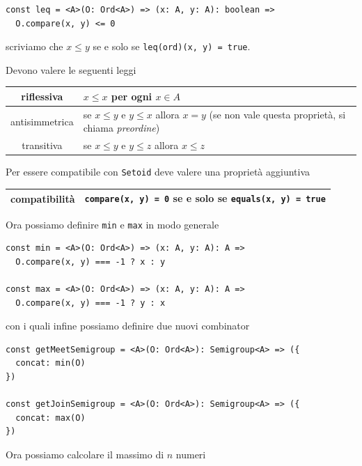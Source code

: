 \documentclass[12pt]{article}
\begin{document}
\begin{verbatim}
const leq = <A>(O: Ord<A>) => (x: A, y: A): boolean =>
  O.compare(x, y) <= 0
\end{verbatim}

scriviamo che $x \leq y$ se e solo se \texttt{leq(ord)(x, y) = true}.

Devono valere le seguenti leggi

\begin{center}
\bgroup
\def\arraystretch{1.5}
\begin{tabular}{ |c|p{10cm}| }
\hline
riflessiva & $x \leq x$ per ogni $x \in A$ \\
\hline
antisimmetrica & se $x \leq y$ e $y \leq x$ allora $x = y$ (se non vale questa proprietà, si chiama \emph{preordine}) \\
\hline
transitiva & se $x \leq y$ e $y \leq z$ allora $x \leq z$ \\
\hline
\end{tabular}
\egroup
\end{center}

Per essere compatibile con \texttt{Setoid} deve valere una proprietà aggiuntiva

\begin{center}
\bgroup
\def\arraystretch{1.5}
\begin{tabular}{ |c|p{10cm}| }
\hline
compatibilità & \texttt{compare(x, y) = 0} se e solo se \texttt{equals(x, y) = true} \\
\hline
\end{tabular}
\egroup
\end{center}

Ora possiamo definire \texttt{min} e \texttt{max} in modo generale

\begin{verbatim}
const min = <A>(O: Ord<A>) => (x: A, y: A): A =>
  O.compare(x, y) === -1 ? x : y

const max = <A>(O: Ord<A>) => (x: A, y: A): A =>
  O.compare(x, y) === -1 ? y : x
\end{verbatim}

con i quali infine possiamo definire due nuovi combinator

\begin{verbatim}
const getMeetSemigroup = <A>(O: Ord<A>): Semigroup<A> => ({
  concat: min(O)
})

const getJoinSemigroup = <A>(O: Ord<A>): Semigroup<A> => ({
  concat: max(O)
})
\end{verbatim}

Ora possiamo calcolare il massimo di $n$ numeri
\end{document}
